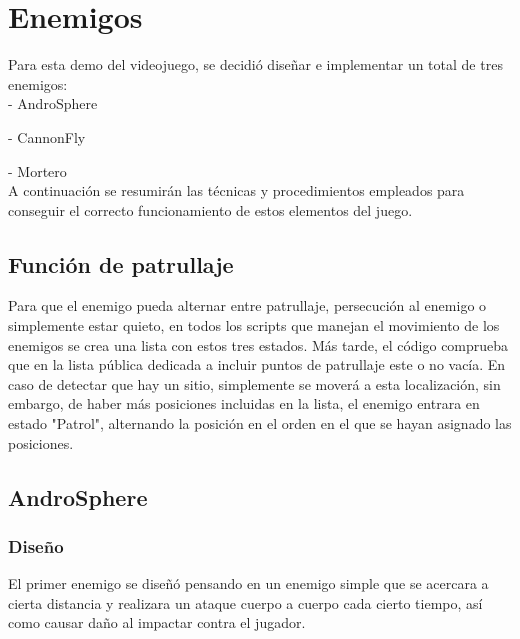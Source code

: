 \documentclass[12pt,spanish]{article}
\begin{document}

\newpage

\section{Enemigos}

    Para esta demo del videojuego, se decidió diseñar e implementar un total de tres enemigos:\\

    - AndroSphere

    - CannonFly

    - Mortero\\

    A continuación se resumirán las técnicas y procedimientos empleados para conseguir el correcto funcionamiento de estos elementos del juego.

\subsection{Función de patrullaje}

    Para que el enemigo pueda alternar entre patrullaje, persecución al enemigo o simplemente estar quieto, en todos los scripts que manejan el movimiento de los enemigos se crea una lista con estos tres estados. Más tarde, el código comprueba que en la lista pública dedicada a incluir puntos de patrullaje este o no vacía. En caso de detectar que hay un sitio, simplemente se moverá a esta localización, sin embargo, de haber más posiciones incluidas en la lista, el enemigo entrara en estado "Patrol", alternando la posición en el orden en el que se hayan asignado las posiciones.

\newpage

\subsection{AndroSphere}

\subsubsection{Diseño}

    El primer enemigo se diseñó pensando en un enemigo simple que se acercara a cierta distancia y realizara un ataque cuerpo a cuerpo cada cierto tiempo, así como causar daño al impactar contra el jugador.
\end{document}
